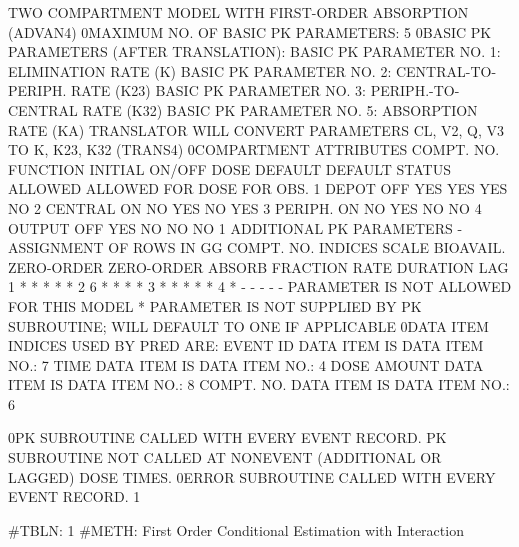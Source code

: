 \documentclass[
  letterpaper,
  toc=chapterentrywithdots,
  listof=totoc,
  11pt,
  headings=small,
  usegeometry]{scrreprt}
\begin{document}
\begin{nonmemlisting}
 TWO COMPARTMENT MODEL WITH FIRST-ORDER ABSORPTION (ADVAN4)
0MAXIMUM NO. OF BASIC PK PARAMETERS:   5
0BASIC PK PARAMETERS (AFTER TRANSLATION):
   BASIC PK PARAMETER NO.  1: ELIMINATION RATE (K)
   BASIC PK PARAMETER NO.  2: CENTRAL-TO-PERIPH. RATE (K23)
   BASIC PK PARAMETER NO.  3: PERIPH.-TO-CENTRAL RATE (K32)
   BASIC PK PARAMETER NO.  5: ABSORPTION RATE (KA)
 TRANSLATOR WILL CONVERT PARAMETERS
 CL, V2, Q, V3 TO K, K23, K32 (TRANS4)
0COMPARTMENT ATTRIBUTES
 COMPT. NO.   FUNCTION   INITIAL    ON/OFF      DOSE      DEFAULT    DEFAULT
                         STATUS     ALLOWED    ALLOWED    FOR DOSE   FOR OBS.
    1         DEPOT        OFF        YES        YES        YES        NO
    2         CENTRAL      ON         NO         YES        NO         YES
    3         PERIPH.      ON         NO         YES        NO         NO
    4         OUTPUT       OFF        YES        NO         NO         NO
1
 ADDITIONAL PK PARAMETERS - ASSIGNMENT OF ROWS IN GG
 COMPT. NO.                             INDICES
              SCALE      BIOAVAIL.   ZERO-ORDER  ZERO-ORDER  ABSORB
                         FRACTION    RATE        DURATION    LAG
    1            *           *           *           *           *
    2            6           *           *           *           *
    3            *           *           *           *           *
    4            *           -           -           -           -
             - PARAMETER IS NOT ALLOWED FOR THIS MODEL
             * PARAMETER IS NOT SUPPLIED BY PK SUBROUTINE;
               WILL DEFAULT TO ONE IF APPLICABLE
0DATA ITEM INDICES USED BY PRED ARE:
   EVENT ID DATA ITEM IS DATA ITEM NO.:      7
   TIME DATA ITEM IS DATA ITEM NO.:          4
   DOSE AMOUNT DATA ITEM IS DATA ITEM NO.:   8
   COMPT. NO. DATA ITEM IS DATA ITEM NO.:    6

0PK SUBROUTINE CALLED WITH EVERY EVENT RECORD.
 PK SUBROUTINE NOT CALLED AT NONEVENT (ADDITIONAL OR LAGGED) DOSE TIMES.
0ERROR SUBROUTINE CALLED WITH EVERY EVENT RECORD.
1


 #TBLN:      1
 #METH: First Order Conditional Estimation with Interaction


\end{nonmemlisting}
\end{document}
